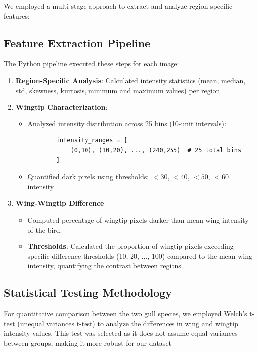 \documentclass[a4paper,12pt]{report}
\begin{document}

We employed a multi-stage approach to extract and analyze region-specific features:

\subsection{Feature Extraction Pipeline}
The Python pipeline executed these steps for each image:
\begin{enumerate}
    \item \textbf{Region-Specific Analysis}: Calculated intensity statistics (mean, median, std, skewness, kurtosis, minimum and maximum values) per region
 
    \item \textbf{Wingtip Characterization}:
    \begin{itemize}
        \item Analyzed intensity distribution across 25 bins (10-unit intervals):
        \begin{verbatim}
        intensity_ranges = [
            (0,10), (10,20), ..., (240,255)  # 25 total bins
        ]
        \end{verbatim}
        \item Quantified dark pixels using thresholds: $<30$, $<40$, $<50$, $<60$ intensity
    \end{itemize}
    \item \textbf{Wing-Wingtip Difference}
    \begin{itemize}
        \item Computed percentage of wingtip pixels darker than mean wing intensity of the bird.
        \item \textbf{Thresholds}: Calculated the proportion of wingtip pixels exceeding specific difference thresholds (10, 20, ..., 100) compared to the mean wing intensity, quantifying the contrast between regions.
    \end{itemize}
\end{enumerate}

\subsection{Statistical Testing Methodology}
For quantitative comparison between the two gull species, we employed Welch's t-test (unequal variances t-test) to analyze the differences in wing and wingtip intensity values. This test was selected as it does not assume equal variances between groups, making it more robust for our dataset.
\end{document}
